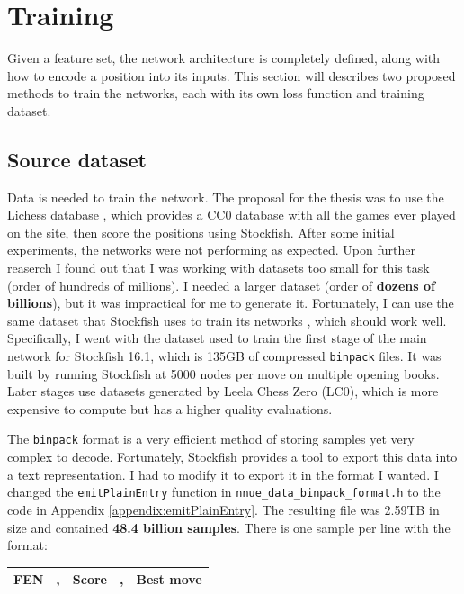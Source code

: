 \section{Training}

Given a feature set, the network architecture is completely defined, along with how to encode a position into its inputs. This section will describes two proposed methods to train the networks, each with its own loss function and training dataset.

\subsection{Source dataset}

Data is needed to train the network. The proposal for the thesis was to use the Lichess database \cite{lichessdb}, which provides a CC0 database with all the games ever played on the site, then score the positions using Stockfish. After some initial experiments, the networks were not performing as expected. Upon further reaserch I found out that I was working with datasets too small for this task (order of hundreds of millions). I needed a larger dataset (order of \textbf{dozens of billions}), but it was impractical for me to generate it. Fortunately, I can use the same dataset that Stockfish uses to train its networks \cite{sf_nnue_dataset}, which should work well. Specifically, I went with the dataset used to train the first stage of the main network for Stockfish 16.1, which is 135GB of compressed \texttt{binpack} files. It was built by running Stockfish at 5000 nodes per move on multiple opening books. Later stages use datasets generated by Leela Chess Zero (LC0), which is more expensive to compute but has a higher quality evaluations.

The \texttt{binpack} format is a very efficient method of storing samples yet very complex to decode. Fortunately, Stockfish provides a tool to export this data into a text representation. I had to modify it to export it in the format I wanted. I changed the \texttt{emitPlainEntry} function in \texttt{nnue\_data\_binpack\_format.h} to the code in Appendix \ref{appendix:emitPlainEntry}. The resulting file was 2.59TB in size and contained \textbf{48.4 billion samples}. There is one sample per line with the format:

\begin{center}
\begin{tabular}{|cp{0.0005cm}cp{0.0005cm}c|}
\hline
\textbf{FEN\footnotemark} & , & \textbf{Score} & , & \textbf{Best move} \\
\hline
\end{tabular}
\end{center}

